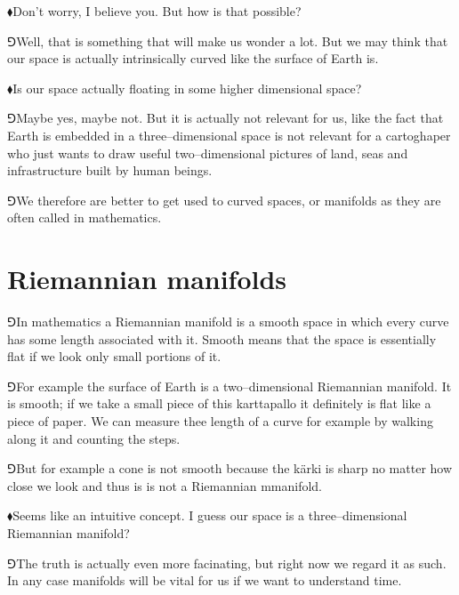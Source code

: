 \documentclass[10pt,oneside%
]{memoir}
\newcommand{\hea}{\(\blacklozenge\)\;}
\newcommand{\heb}{\(\Game\)\;}
\begin{document}
\hea Don't worry, I believe you. But how is that possible?

\heb Well, that is something that will make us wonder a lot. But we may think that our space is actually intrinsically curved like the surface of Earth is.

\hea Is our space actually floating in some higher dimensional space?

\heb Maybe yes, maybe not. But it is actually not relevant for us, like the fact that Earth is embedded in a three--dimensional space is not relevant for a cartoghaper who just wants to draw useful two--dimensional pictures of land, seas and infrastructure built by human beings.

\heb We therefore are better to get used to curved spaces, or manifolds as they are often called in mathematics.






























\section{Riemannian manifolds}
\heb In mathematics a Riemannian manifold is a smooth space in which every curve has some length associated with it. Smooth means that the space is essentially flat if we look only small portions of it.

\heb For example the surface of Earth is a two--dimensional Riemannian manifold. It is smooth; if we take a small piece of this karttapallo it definitely is flat like a piece of paper. We can measure thee length of a curve for example by walking along it and counting the steps.

\heb But for example a cone is not smooth because the kärki is sharp no matter how close we look and thus is is not a Riemannian mmanifold.

\hea Seems like an intuitive concept. I guess our space is a three--dimensional Riemannian manifold?

\heb The truth is actually even more facinating, but right now we regard it as such. In any case manifolds will be vital for us if we want to understand time.
\end{document}
